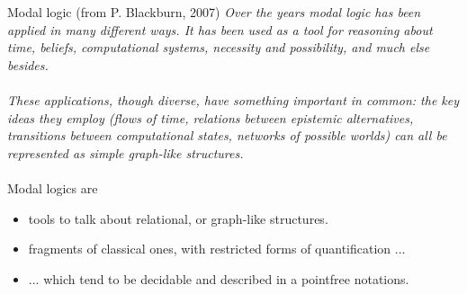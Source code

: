 \documentclass[aspectratio=169]{beamer}
\begin{document}
\begin{slide}{Modal logic (from P. Blackburn, 2007)}\label{s:9}
\small
\emph{Over the years modal logic has been applied in many different ways. It has been used as a tool for reasoning about \alert{time, beliefs, computational systems, necessity} and \alert{possibility}, and much else besides. \\
~\\

These applications, though diverse, have something important in common: the key ideas they employ (flows of time, relations between epistemic alternatives, transitions between computational states, networks of possible worlds) can all be represented as \alert{simple graph-like structures}.  }
~\\
~\\

Modal logics are
\begin{itemize}
\item  \alert{tools to talk about relational, or graph-like structures}.
\item  \alert{fragments of classical ones}, with restricted forms of quantification ...
\item  ... which tend to be \alert{decidable} and described in a pointfree notations.
\end{itemize}
\end{slide}


\newcommand{\impp}{\mathbin{\rightarrow}}
\newcommand{\dimpp}{\mathbin{\leftrightarrow}}
\newcommand{\always}{\boxempty}
\newcommand{\nexts}{\bigcirc}
\newcommand{\until}{\mathbin{\mathcal U}}
\newcommand{\eventual}{\Diamond}
\newcommand{\true}{\mathsf{true}}
\newcommand{\false}{\mathsf{false}}
\newcommand{\fdec}[3]{#1: #2 \longrightarrow  #3}
\newcommand{\pow}[1]{{\cal P}#1}
\newcommand{\tran}[1]{\stackrel{#1}{\longrightarrow}}
\newcommand{\PP}{\alert{P}}
\newcommand{\universal}[2]{\forall_{#1}\; .\; #2}
\newcommand{\existential}[2]{\exists_{#1}\; .\; #2}
\newcommand{\enset}[1]{\mathopen{ \{ }#1\mathclose{ \} }} %
\newcommand{\diam}[1]{\ensuremath{\langle #1 \rangle}}
\newcommand{\boxx}[1]{\ensuremath{[#1]}}
\newcommand{\evm}[1]{\langle #1 \rangle\,}
\newcommand{\alm}[1]{[#1]\,}
\newcommand{\evmb}[1]{\evm{\alert{#1}}}
\newcommand{\almb}[1]{\alm{\alert{#1}}}
\end{document}

